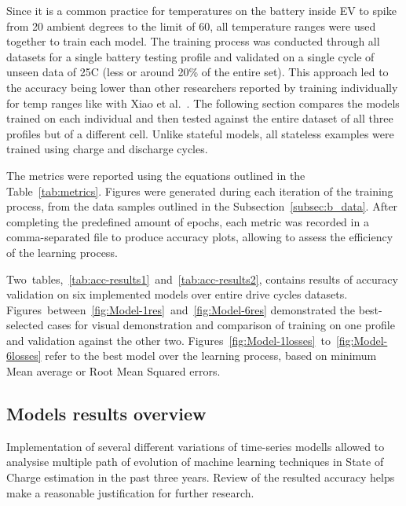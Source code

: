 Since it is a common practice for temperatures on the battery inside EV to spike from 20 ambient degrees to the limit of 60, all temperature ranges were used together to train each model.
The training process was conducted through all datasets for a single battery testing profile and validated on a single cycle of unseen data of 25\textdegree{}C (less or around 20\% of the entire set).
This approach led to the accuracy being lower than other researchers reported by training individually for temp ranges like with Xiao et al.~\cite{xiao_accurate_2019}.
The following section compares the models trained on each individual and then tested against the entire dataset of all three profiles but of a different cell.
Unlike stateful models, all stateless examples were trained using charge and discharge cycles.

%
%
The metrics were reported using the equations outlined in the \mbox{Table~\ref{tab:metrics}}.
Figures were generated during each iteration of the training process, from the data samples outlined in the \mbox{Subsection~\ref{subsec:b_data}}.
After completing the predefined amount of epochs, each metric was recorded in a comma-separated file to produce accuracy plots, allowing to assess the efficiency of the learning process.

%
%
\mbox{Two tables, \ref{tab:acc-results1} and \ref{tab:acc-results2}}, contains results of accuracy validation on six implemented models over entire drive cycles datasets.
\mbox{Figures between \ref{fig:Model-1res} and \ref{fig:Model-6res}} demonstrated the best-selected cases for visual demonstration and comparison of training on one profile and validation against the other two.
\mbox{Figures \ref{fig:Model-1losses} to \ref{fig:Model-6losses}} refer to the best model over the learning process, based on minimum Mean average or Root Mean Squared errors.

%
%
\subsection{Models results overview}
Implementation of several different variations of time-series modells allowed to analysise multiple path of evolution of machine learning techniques in State of Charge estimation in the past three years.
Review of the resulted accuracy helps make a reasonable justification for further research.

